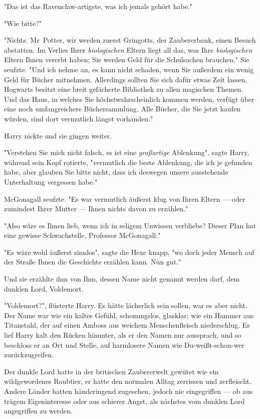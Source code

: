 {"Das ist das Ravenclaw-artigste, was ich jemals gehört habe."

"Wie bitte?"

"Nichts. Mr~Potter, wir werden zuerst Gringotts, der Zaubererbank, einen Besuch abstatten. Im Verlies Ihrer \emph{biologischen} Eltern liegt all das, was Ihre \emph{biologischen} Eltern Ihnen vererbt haben; Sie werden Geld für die Schulsachen brauchen." Sie seufzte. "Und ich nehme an, es kann nicht schaden, wenn Sie außerdem ein wenig Geld für Bücher mitnehmen. Allerdings sollten Sie sich dafür etwas Zeit lassen. Hogwarts besitzt eine breit gefächerte Bibliothek zu allen magischen Themen. Und das Haus, in welches Sie höchstwahrscheinlich kommen werden, verfügt über eine noch umfangreichere Büchersammlung. Alle Bücher, die Sie jetzt kaufen würden, sind dort vermutlich längst vorhanden."

Harry nickte und sie gingen weiter.

"Verstehen Sie mich nicht falsch, es ist eine \emph{großartige} Ablenkung", sagte Harry, während sein Kopf rotierte, "vermutlich die beste Ablenkung, die ich je gefunden habe, aber glauben Sie bitte nicht, dass ich deswegen unsere ausstehende Unterhaltung vergessen habe."

McGonagall seufzte. "Es war vermutlich äußerst klug von Ihren Eltern --- oder zumindest Ihrer Mutter --- Ihnen nichts davon zu erzählen."

"Also wäre es Ihnen lieb, wenn ich in seligem Unwissen verbliebe? Dieser Plan hat eine gewisse Schwachstelle, Professor McGonagall."

"Es wäre wohl äußerst sinnlos", sagte die Hexe knapp, "wo doch jeder Mensch auf der Straße Ihnen die Geschichte erzählen kann. Nun gut."

Und sie erzählte ihm von Ihm, dessen Name nicht genannt werden darf, dem dunklen Lord, Voldemort.

"Voldemort?", flüsterte Harry. Es hätte lächerlich sein sollen, war es aber nicht. Der Name war wie ein kaltes Gefühl, schonungslos, glasklar; wie ein Hammer aus Titanstahl, der auf einen Amboss aus weichem Menschenfleisch niederschlug. Es lief Harry kalt den Rücken hinunter, als er den Namen nur aussprach, und so beschloss er an Ort und Stelle, auf harmlosere Namen wie Du-weißt-schon-wer zurückzugreifen.

Der dunkle Lord hatte in der britischen Zaubererwelt gewütet wie ein wildgewordenes Raubtier, er hatte den normalen Alltag zerrissen und zerfleischt. Andere Länder hatten händeringend zugesehen, jedoch nie eingegriffen --- ob aus trägem Eigeninteresse oder aus schierer Angst, als nächstes vom dunklen Lord angegriffen zu werden.

}
